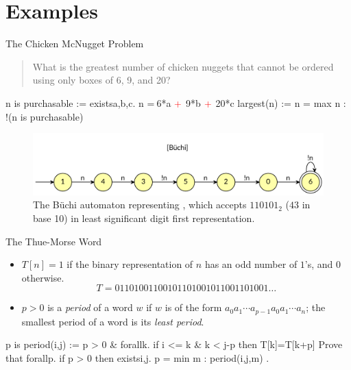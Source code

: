 \documentclass[leqno,presentation,usenames,dvipsnames]{beamer}
\begin{document}
\section{Examples}
\begin{frame}[fragile]{The Chicken McNugget Problem}
    
\begin{quote}
    What is the greatest number of chicken nuggets that cannot be ordered using only boxes of 6, 9, and 20?
\end{quote}

\begin{pecan}
n is purchasable := existsa,b,c. n =$\ $6*a $\color{red} +$ 9*b $\color{red} +$ 20*c
largest(n) := n = max { n : !(n is purchasable) }
\end{pecan}
\vspace{-1em}
\begin{figure}
    \centering
    \includegraphics[width=\textwidth]{images/largest_not_purchasable.pdf}
    \caption{The B\"uchi automaton representing , which accepts $110101_2$ ($43$ in base 10) in least significant digit first representation.}
    \label{fig:largest_non_purchasable}
\end{figure}
\end{frame}

\begin{frame}[fragile]{The Thue-Morse Word}
    \begin{itemize}
        \item $T[n] = 1$ if the binary representation of $n$ has an odd number of $1$'s, and $0$ otherwise.
        \[
            T = 01101001100101101001011001101001\ldots
        \]
        
        \item $p > 0$ is a \emph{period} of a word $w$ if $w$ is of the form $a_0 a_1 \cdots a_{p-1} a_0 a_1 \cdots a_n$; the smallest period of a word is its \emph{least period}.
        
    \end{itemize}
    
\begin{pecan}
p is period(i,j) := p > 0 &
    forallk. if i <= k & k < j-p then T[k]=T[k+p]
Prove that {
    forallp. if p > 0 then 
        existsi,j. p = min { m : period(i,j,m) }
}.
\end{pecan}
\end{frame}
\end{document}
